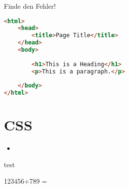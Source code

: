 \documentclass[a4paper]{exam}
\begin{document}
		Finde den Fehler!
		\newline
		\begin{lstlisting}[language=html]
<html>
    <head>
        <title>Page Title</title>
    </head>
    <body>
    
        <h1>This is a Heading</h1>
        <p>This is a paragraph.</p>
        
    </body>
</html> 
		\end{lstlisting}
		\vfill
		\newpage
		
		\section{CSS}
			\begin{itemize}
				\item 
			\end{itemize}
		\begin{checkboxes}
			\choice test
		\end{checkboxes}
		
		 
		123456+789 =\fillin[123456] \hfill {}
\end{document}

